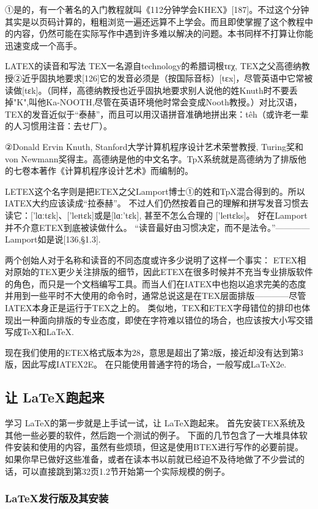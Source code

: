 \documentclass[UTF8]{ctexart}
\begin{document}
①是的，有一个著名的入门教程就叫《112分钟学会KHEX》[187]。不过这个分钟其实是以页码计算的，粗粗浏览一遍还远算不上学会。而且即使掌握了这个教程中的内容，仍然可能在实际写作中遇到许多难以解决的问题。本书同样不打算让你能迅速变成一个高手。

LATEX的读音和写法
TEX一名源自technology的希腊词根τεχ, TEX之父高德纳教授②近乎固执地要求[126]它的发音必须是（按国际音标）[tεx]，尽管英语中它常被读做[tεk]。（同样，高德纳教授也近乎固执地要求别人说他的姓Knuth时不要丢掉"K",叫他Ka-NOOTH,尽管在英语环境他时常会变成Nooth教授。）对比汉语，TEX的发音近似于“泰赫”，而且可以用汉语拼音准确地拼出来：têh（或许老一辈的人习惯用注音：去せ厂）。

②Donald Ervin Knuth, Stanford大学计算机程序设计艺术荣誉教授, Turing奖和von Newmann奖得主。高德纳是他的中文名字。TpX系统就是高德纳为了排版他的七卷本著作《计算机程序设计艺术》而编制的。

LETEX这个名字则是把ETEX之父Lamport博士①的姓和TpX混合得到的。所以IATEX大约应该读成“拉泰赫”。
不过人们仍然按着自己的理解和拼写发音习惯去读它：['lɑːtεk]、['leɪtεk]或是[lɑː'tεk], 甚至不怎么合理的 ['leɪtεks]。
好在Lamport并不介意ETEX到底被读做什么。
“读音最好由习惯决定，而不是法令。”————Lamport如是说[136,§1.3].

两个创始人对于名称和读音的不同态度或许多少说明了这样一个事实：
ETEX相对原始的TEX更少关注排版的细节，因此ETEX在很多时候并不充当专业排版软件的角色，而只是一个文档编写工具。而当人们在IATEX中也抱以追求完美的态度并用到一些平时不大使用的命令时，通常总说这是在TEX层面排版————尽管IATEX本身正是运行于TEX之上的。
类似地，TEX和ETEX字母错位的排印也体现出一种面向排版的专业态度，即使在字符难以错位的场合，也应该按大小写交错写成TeX和LaTeX.

现在我们使用的ETEX格式版本为28，意思是超出了第2版，接近却没有达到第3版，因此写成IATEX2E。
在只能使用普通字符的场合，一般写成LaTeX2e.

\subsection{让 \LaTeX 跑起来}
\label{sub:让LaTeX跑起来}

学习 \LaTeX 的第一步就是上手试一试，让 \LaTeX 跑起来。
首先安装TEX系统及其他一些必要的软件，然后跑一个测试的例子。
下面的几节包含了一大堆具体软件安装和使用的内容，虽然有些烦琐，但这是使用BTEX进行写作的必要前提。
如果你早已做好这些准备，或者在读本书以前就已经迫不及待地做了不少尝试的话，可以直接跳到第32页1.2节开始第一个实际规模的例子。

\subsubsection{\LaTeX 发行版及其安装}
\label{subsub:LaTeX发行版及其安装}
\end{document}
